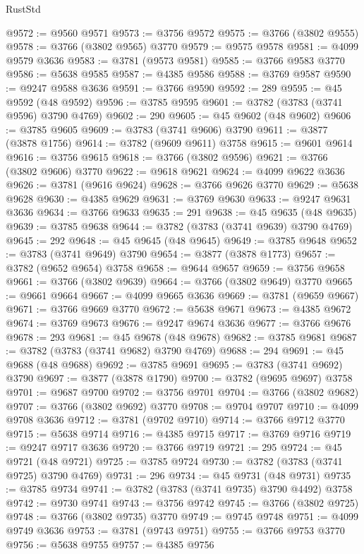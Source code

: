\begin{lexlean}{RustStd}
\begin{coremodule}
@9572 := @9560 @9571
@9573 := @3756 @9572
@9575 := @3766 (@3802 @9555)
@9578 := @3766 (@3802 @9565) @3770
@9579 := @9575 @9578
@9581 := @4099 @9579 @3636
@9583 := @3781 (@9573 @9581)
@9585 := @3766 @9583 @3770
@9586 := @5638 @9585
@9587 := @4385 @9586
@9588 := @3769 @9587
@9590 := @9247 @9588 @3636
@9591 := @3766 @9590
@9592 := 289
@9595 := @45 @9592 (@48 @9592)
@9596 := @3785 @9595
@9601 := @3782 (@3783 (@3741 @9596) @3790 @4769)
@9602 := 290
@9605 := @45 @9602 (@48 @9602)
@9606 := @3785 @9605
@9609 := @3783 (@3741 @9606) @3790
@9611 := @3877 (@3878 @1756)
@9614 := @3782 (@9609 @9611) @3758
@9615 := @9601 @9614
@9616 := @3756 @9615
@9618 := @3766 (@3802 @9596)
@9621 := @3766 (@3802 @9606) @3770
@9622 := @9618 @9621
@9624 := @4099 @9622 @3636
@9626 := @3781 (@9616 @9624)
@9628 := @3766 @9626 @3770
@9629 := @5638 @9628
@9630 := @4385 @9629
@9631 := @3769 @9630
@9633 := @9247 @9631 @3636
@9634 := @3766 @9633
@9635 := 291
@9638 := @45 @9635 (@48 @9635)
@9639 := @3785 @9638
@9644 := @3782 (@3783 (@3741 @9639) @3790 @4769)
@9645 := 292
@9648 := @45 @9645 (@48 @9645)
@9649 := @3785 @9648
@9652 := @3783 (@3741 @9649) @3790
@9654 := @3877 (@3878 @1773)
@9657 := @3782 (@9652 @9654) @3758
@9658 := @9644 @9657
@9659 := @3756 @9658
@9661 := @3766 (@3802 @9639)
@9664 := @3766 (@3802 @9649) @3770
@9665 := @9661 @9664
@9667 := @4099 @9665 @3636
@9669 := @3781 (@9659 @9667)
@9671 := @3766 @9669 @3770
@9672 := @5638 @9671
@9673 := @4385 @9672
@9674 := @3769 @9673
@9676 := @9247 @9674 @3636
@9677 := @3766 @9676
@9678 := 293
@9681 := @45 @9678 (@48 @9678)
@9682 := @3785 @9681
@9687 := @3782 (@3783 (@3741 @9682) @3790 @4769)
@9688 := 294
@9691 := @45 @9688 (@48 @9688)
@9692 := @3785 @9691
@9695 := @3783 (@3741 @9692) @3790
@9697 := @3877 (@3878 @1790)
@9700 := @3782 (@9695 @9697) @3758
@9701 := @9687 @9700
@9702 := @3756 @9701
@9704 := @3766 (@3802 @9682)
@9707 := @3766 (@3802 @9692) @3770
@9708 := @9704 @9707
@9710 := @4099 @9708 @3636
@9712 := @3781 (@9702 @9710)
@9714 := @3766 @9712 @3770
@9715 := @5638 @9714
@9716 := @4385 @9715
@9717 := @3769 @9716
@9719 := @9247 @9717 @3636
@9720 := @3766 @9719
@9721 := 295
@9724 := @45 @9721 (@48 @9721)
@9725 := @3785 @9724
@9730 := @3782 (@3783 (@3741 @9725) @3790 @4769)
@9731 := 296
@9734 := @45 @9731 (@48 @9731)
@9735 := @3785 @9734
@9741 := @3782 (@3783 (@3741 @9735) @3790 @4492) @3758
@9742 := @9730 @9741
@9743 := @3756 @9742
@9745 := @3766 (@3802 @9725)
@9748 := @3766 (@3802 @9735) @3770
@9749 := @9745 @9748
@9751 := @4099 @9749 @3636
@9753 := @3781 (@9743 @9751)
@9755 := @3766 @9753 @3770
@9756 := @5638 @9755
@9757 := @4385 @9756

\end{coremodule}
\end{lexlean}
